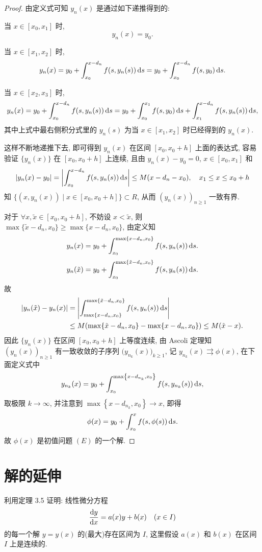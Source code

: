 \begin{proof}
  由定义式可知 $y_n(x)$ 是通过如下递推得到的:

  当 $x\in[x_0,x_1]$ 时,
  \[y_n(x)=y_0.\]

  当 $x\in[x_1,x_2]$ 时,
  \[y_n(x)=y_0+\int_{x_0}^{x-d_n}f(s,y_n(s))\mathop{}\!\mathrm{d} s=y_0+\int_{x_0}^{x-d_n}f(s,y_0)\mathop{}\!\mathrm{d} s.\]

  当 $x\in[x_2,x_3]$ 时,
  \[y_n(x)=y_0+\int_{x_0}^{x-d_n}f(s,y_n(s))\mathop{}\!\mathrm{d} s=y_0+\int_{x_0}^{x_1}f(s,y_0)\mathop{}\!\mathrm{d} s+\int_{x_1}^{x-d_n}f(s,y_n(s))\mathop{}\!\mathrm{d} s,\]
  其中上式中最右侧积分式里的 $y_n(s)$ 为当 $x\in[x_1,x_2]$ 时已经得到的 $y_n(x)$.

  这样不断地递推下去, 即可得到 $y_n(x)$ 在区间 $[x_0,x_0+h]$ 上面的表达式,
  容易验证 $\{y_n(x)\}$ 在 $[x_0,x_0+h]$ 上连续, 且由 $y_n(x)-y_0=0$, $x\in[x_0,x_1]$ 和
  \[|y_n(x)-y_0|=\biggl|\int_{x_0}^{x-d_n}f(s,y_n(s))\mathop{}\!\mathrm{d} s\biggr|\leq M(x-d_n-x_0),
    \quad x_1\leq x\leq x_0+h\]
  知 $\{(x,y_n(x))\mid x\in[x_0,x_0+h]\}\subset R$, 从而 $(y_n(x))_{n\geq 1}$ 一致有界.

  对于 $\forall x,\tilde{x}\in[x_0,x_0+h]$, 不妨设 $x<\tilde{x}$,
  则 $\max\{\tilde{x}-d_n,x_0\}\geq\max\{x-d_n,x_0\}$, 由定义知
  \[y_n(x)=y_0+\int_{x_0}^{\max\{x-d_n,x_0\}}f(s,y_n(s))\mathop{}\!\mathrm{d} s.\]
  \[y_n(\tilde{x})=y_0+\int_{x_0}^{\max\{\tilde{x}-d_n,x_0\}}f(s,y_n(s))\mathop{}\!\mathrm{d} s.\]
  故
  \[\begin{split}
    |y_n(\tilde{x})-y_n(x)|
    & = \left|\int_{\max\{x-d_n,x_0\}}^{\max\{\tilde{x}-d_n,x_0\}}f(s,y_n(s))\mathop{}\!\mathrm{d} s\right|\\
    & \leq M(\max\{\tilde{x}-d_n,x_0\}-\max\{x-d_n,x_0\})\leq M(\tilde{x}-x).
  \end{split}\]
  因此 $\{y_n(x)\}$ 在区间 $[x_0,x_0+h]$ 上等度连续,
  由 Ascoli 定理知 $(y_n(x))_{n\geq 1}$ 有一致收敛的子序列
  $\bigl(y_{n_k}(x)\bigr)_{k\geq 1}$, 记 $y_{n_k}(x)\rightrightarrows\phi(x)$, 在下面定义式中
  \[y_{n_k}(x)=y_0+\int_{x_0}^{\max\left\{x-d_{n_k},x_0\right\}}f(s,y_{n_k}(s))\mathop{}\!\mathrm{d} s,\]
  取极限 $k\to\infty$, 并注意到 $\max\left\{x-d_{n_k},x_0\right\}\to x$, 即得
  \[\phi(x)=y_0+\int_{x_0}^xf(s,\phi(s))\mathop{}\!\mathrm{d} s.\]
  故 $\phi(x)$ 是初值问题 $(E)$ 的一个解.
\end{proof}



\section{解的延伸}



\begin{exercise}
  利用定理 3.5 证明: 线性微分方程
  \[\frac{\mathop{}\!\mathrm{d} y}{\mathop{}\!\mathrm{d} x}=a(x)y+b(x)\quad (x\in I)\]
  的每一个解 $y=y(x)$ 的(最大)存在区间为 $I$, 这里假设 $a(x)$ 和 $b(x)$ 在区间 $I$ 上是连续的.
\end{exercise}

